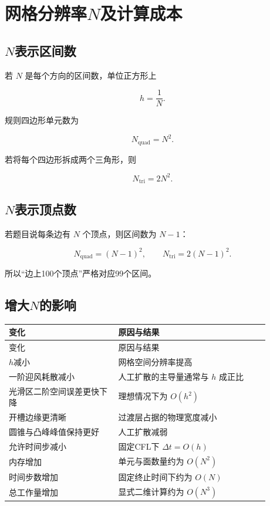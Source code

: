 \documentclass[UTF8,12pt,a4paper,fontset=fandol]{ctexart}
\numberwithin{equation}{section}
\begin{document}
\section{网格分辨率\texorpdfstring{$N$}{N}及计算成本}

\subsection{\texorpdfstring{$N$}{N}表示区间数}

若 $N$ 是每个方向的区间数，单位正方形上

\begin{equation}
  h=\frac1N.
\end{equation}

规则四边形单元数为

\begin{equation}
  N_{\mathrm{quad}}=N^2.
\end{equation}

若将每个四边形拆成两个三角形，则

\begin{equation}
  N_{\mathrm{tri}}=2N^2.
\end{equation}

\subsection{\texorpdfstring{$N$}{N}表示顶点数}

若题目说每条边有 $N$ 个顶点，则区间数为 $N-1$：

\begin{equation}
  N_{\mathrm{quad}}=(N-1)^2,
  \qquad
  N_{\mathrm{tri}}=2(N-1)^2.
\end{equation}

所以“边上100个顶点”严格对应99个区间。

\subsection{增大\texorpdfstring{$N$}{N}的影响}

\begin{longtable}{L{0.37\linewidth}L{0.51\linewidth}}
\toprule
变化 & 原因与结果\\
\midrule
\endfirsthead
\toprule
变化 & 原因与结果\\
\midrule
\endhead
$h$减小 & 网格空间分辨率提高\\
一阶迎风耗散减小 & 人工扩散的主导量通常与 $h$ 成正比\\
光滑区二阶空间误差更快下降 & 理想情况下为 $O(h^2)$\\
开槽边缘更清晰 & 过渡层占据的物理宽度减小\\
圆锥与凸峰峰值保持更好 & 人工扩散减弱\\
允许时间步减小 & 固定CFL下 $\Delta t=O(h)$\\
内存增加 & 单元与面数量约为 $O(N^2)$\\
时间步数增加 & 固定终止时间下约为 $O(N)$\\
总工作量增加 & 显式二维计算约为 $O(N^3)$\\
\bottomrule
\end{longtable}
\end{document}
